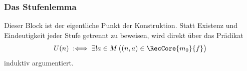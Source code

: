\subsubsection{Das Stufenlemma}

Dieser Block ist der eigentliche Punkt der Konstruktion. Statt Existenz und
Eindeutigkeit jeder Stufe getrennt zu beweisen, wird direkt über das Prädikat
\[
  U(n)\;:\Longleftrightarrow\;
  \exists!a\in M\,\bigl((n,a)\in\RecCore{m_0}{f}\bigr)
\]
induktiv argumentiert.

\par{}
